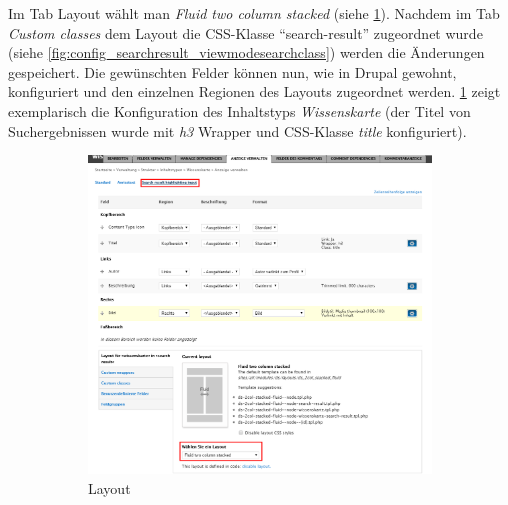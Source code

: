 Im Tab Layout wählt man \textit{Fluid two column stacked} (siehe \cref{fig:config_searchresult_viewmodesearch}). Nachdem im Tab \textit{Custom classes} dem Layout die CSS-Klasse \enquote{search-result} zugeordnet wurde (siehe \cref{fig:config_searchresult_viewmodesearchclass}) werden die Änderungen gespeichert. Die gewünschten Felder können nun, wie in Drupal gewohnt, konfiguriert und den einzelnen Regionen des Layouts zugeordnet werden. \cref{fig:config_searchresult_viewmodesearch} zeigt exemplarisch die Konfiguration des Inhaltstyps \textit{Wissenskarte} (der Titel von Suchergebnissen wurde \zB mit \textit{h3} Wrapper und CSS-Klasse \textit{title} konfiguriert).


\begin{figure}[H]
	\centering
	\begin{subfigure}[b]{0.55\textwidth}
		\centering
		\includegraphics[height=0.35\textheight]{images/config_searchresult_viewmodesearch}
		\caption[]{Layout}
		\label{fig:config_searchresult_viewmodesearch}
	\end{subfigure}
	\begin{subfigure}[b]{0.30\textwidth}
		\centering

\end{subfigure}
\end{figure}
